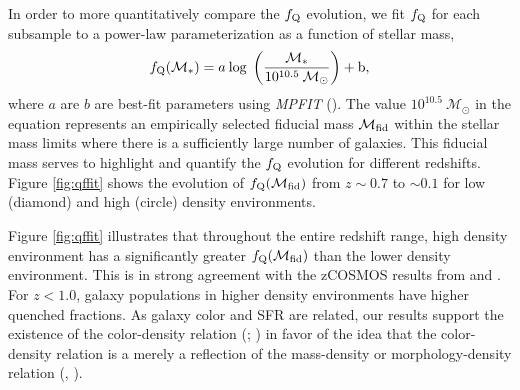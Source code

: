 \documentclass{emulateapj}
\begin{document}
In order to more quantitatively compare the $f_{\rm{Q}}$ evolution, we fit $f_{\rm{Q}}$ for each subsample to a power-law parameterization as a function of stellar mass, 
\begin{equation} 
f_{\rm{Q}}(\mathcal{M}_{*}) = a \: \rm{log} \; \left(\frac{ \mathcal{M}_{*}}{10^{10.5} \: \mathcal{M}_{\odot}} \right)+b,
\end{equation}
where $a$ are $b$ are best-fit parameters using {\em MPFIT} (\cite{Markwardt:2009aa}). The value $10^{10.5} \: \mathcal{M}_{\odot}$ in the equation represents an empirically selected fiducial mass $\mathcal{M}_{\rm{fid}}$ within the stellar mass limits where there is a sufficiently large number of galaxies. This fiducial mass serves to highlight and quantify the $f_{\rm{Q}}$ evolution for different redshifts. Figure \ref{fig:qffit} shows the evolution of $f_{\rm{Q}}(\mathcal{M}_{\rm{fid}})$ from $z \sim 0.7$ to $\sim 0.1$ for low (diamond) and high (circle) density environments. 

Figure \ref{fig:qffit} illustrates that throughout the entire redshift range, high density environment has a significantly greater $f_{\rm{Q}}(\mathcal{M}_{\rm{fid}})$ than the lower density environment. This is in strong agreement with the zCOSMOS results from \cite{Cucciati:2010aa} and \cite{Kovac:2014aa}. For $z < 1.0$, galaxy populations in higher density environments have higher quenched fractions. As galaxy color and SFR are related, our results support the existence of the color-density relation (\cite{Cucciati:2010aa}; \cite{Cooper:2010aa}) in favor of the idea that the color-density relation is a merely a reflection of the mass-density or morphology-density relation (\cite{Scodeggio:2009aa}, \cite{Tasca:2009aa}).  
\end{document}
